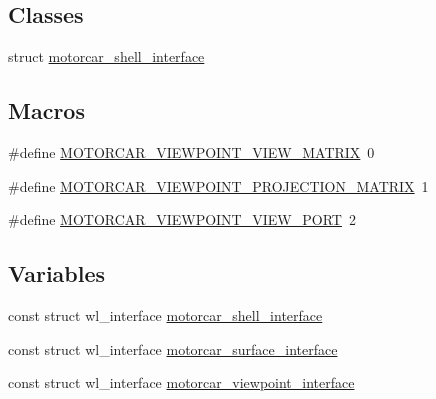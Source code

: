 \subsection*{Classes}
\begin{DoxyCompactItemize}
\item 
struct \hyperlink{structmotorcar__shell__interface}{motorcar\-\_\-shell\-\_\-interface}
\end{DoxyCompactItemize}
\subsection*{Macros}
\begin{DoxyCompactItemize}
\item 
\#define \hyperlink{protocol_2motorcar-server-protocol_8h_a3cec8e451ef597650403195a97bfd54c}{M\-O\-T\-O\-R\-C\-A\-R\-\_\-\-V\-I\-E\-W\-P\-O\-I\-N\-T\-\_\-\-V\-I\-E\-W\-\_\-\-M\-A\-T\-R\-I\-X}~0
\item 
\#define \hyperlink{protocol_2motorcar-server-protocol_8h_a90193588ef42c30b79a2547016ecfbef}{M\-O\-T\-O\-R\-C\-A\-R\-\_\-\-V\-I\-E\-W\-P\-O\-I\-N\-T\-\_\-\-P\-R\-O\-J\-E\-C\-T\-I\-O\-N\-\_\-\-M\-A\-T\-R\-I\-X}~1
\item 
\#define \hyperlink{protocol_2motorcar-server-protocol_8h_a679a63a4096a3edc578272e2308ea515}{M\-O\-T\-O\-R\-C\-A\-R\-\_\-\-V\-I\-E\-W\-P\-O\-I\-N\-T\-\_\-\-V\-I\-E\-W\-\_\-\-P\-O\-R\-T}~2
\end{DoxyCompactItemize}
\subsection*{Variables}
\begin{DoxyCompactItemize}
\item 
const struct wl\-\_\-interface \hyperlink{protocol_2motorcar-server-protocol_8h_a4decf5a74ff7a553e7cb41be3a9c580e}{motorcar\-\_\-shell\-\_\-interface}
\item 
const struct wl\-\_\-interface \hyperlink{protocol_2motorcar-server-protocol_8h_ae2e8f3ce5b87226a6df640361441f5ce}{motorcar\-\_\-surface\-\_\-interface}
\item 
const struct wl\-\_\-interface \hyperlink{protocol_2motorcar-server-protocol_8h_a90843869d07a9812f0b0eb66ed03ed20}{motorcar\-\_\-viewpoint\-\_\-interface}
\end{DoxyCompactItemize}


